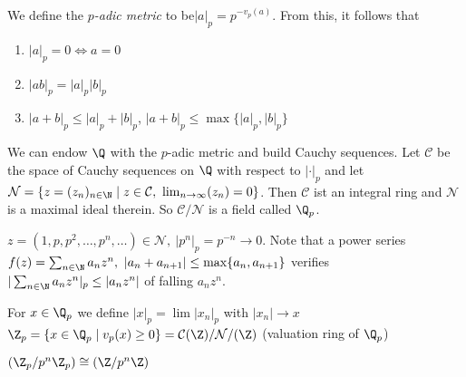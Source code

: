 \documentclass{jvfscript}
\begin{document}
	\begin{defn}
		We define the \emph{$p$-adic metric} to be$ |a|_p = p^{-v_p(a)} $. From this, it follows that
		\begin{enumerate}
			\item $|a|_p = 0 \iff a = 0$
			\item $ |ab|_p = |a|_p |b|_p $
			\item $|a+b|_p \leq |a|_p+|b|_p$, $|a+b|_p \leq \max\{|a|_p,|b|_p\}$
		\end{enumerate}
	\end{defn}
	We can endow $\Q$ with the $p$-adic metric and build Cauchy sequences. Let $\mathcal{C}$ be the space of Cauchy sequences on $\Q$ with respect to $|\cdot|_p$ and let $\mathcal{N} = \{z = (z_n)_{n \in \N} \mid z \in \mathcal{C},\ \lim_{n \to \infty}(z_n) = 0\}$. Then $\mathcal{C}$ ist an integral ring and $\mathcal{N}$ is a maximal ideal therein. So $\mathcal{C}/\mathcal{N}$ is a field called $\Q_p$.
	\begin{exmp}
		$z = (1,p,p^2,\dotsc,p^n,\dotsc) \in \mathcal{N},\ |p^n|_p = p^{-n} \to 0$. Note that a power series $ f(z) = \sum_{n \in \N} a_n z^n,\ |a_n + a_{n+1}| \leq \max\{a_n,a_{n+1}\} $ verifies $ |\sum_{n \in \N} a_nz^n|_p \leq |a_nz^n| $ of falling $ a_nz^n $.
	\end{exmp}
	\begin{defn}
		For $ x \in \Q_p $ we define $ |x|_p = \lim|x_n|_p $ with $|x_n| \to x$\\
		$ \Z_p = \{x \in \Q_p \mid v_p(x) \geq 0\} = \mathcal{C}(\Z)/\mathcal{N}/(\Z) $ (valuation ring of $\Q_p$)
	\end{defn}	
	$ \left( \Z_p/p^n\Z_p \right) \cong \left( \Z/p^n\Z \right) $
	
	
	
	
	
	
	
\end{document}
